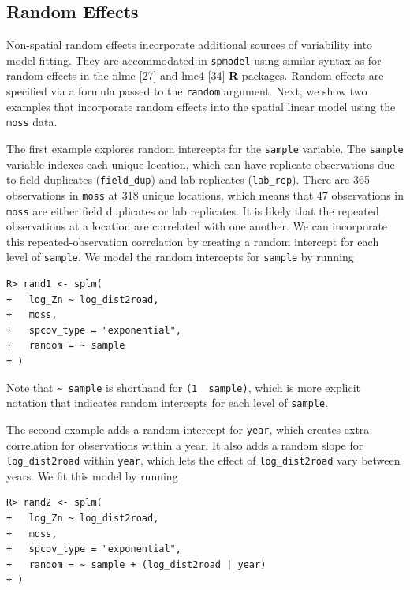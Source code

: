 \documentclass[10pt,letterpaper]{article}
\begin{document}
\hypertarget{random-effects}{%
\subsection{Random Effects}\label{random-effects}}

Non-spatial random effects incorporate additional sources of variability
into model fitting. They are accommodated in \texttt{spmodel} using
similar syntax as for random effects in the nlme {[}27{]} and lme4
{[}34{]} \textbf{\textsf{R}} packages. Random effects are specified via
a formula passed to the \texttt{random} argument. Next, we show two
examples that incorporate random effects into the spatial linear model
using the \texttt{moss} data.

The first example explores random intercepts for the \texttt{sample}
variable. The \texttt{sample} variable indexes each unique location,
which can have replicate observations due to field duplicates
(\texttt{field\_dup}) and lab replicates (\texttt{lab\_rep}). There are
365 observations in \texttt{moss} at 318 unique locations, which means
that 47 observations in \texttt{moss} are either field duplicates or lab
replicates. It is likely that the repeated observations at a location
are correlated with one another. We can incorporate this
repeated-observation correlation by creating a random intercept for each
level of \texttt{sample}. We model the random intercepts for
\texttt{sample} by running

\begin{verbatim}
R> rand1 <- splm(
+   log_Zn ~ log_dist2road,
+   moss,
+   spcov_type = "exponential",
+   random = ~ sample
+ )
\end{verbatim}

Note that \texttt{\textasciitilde{}\ sample} is shorthand for
\texttt{(1\ \textbar{}\ sample)}, which is more explicit notation that
indicates random intercepts for each level of \texttt{sample}.

The second example adds a random intercept for \texttt{year}, which
creates extra correlation for observations within a year. It also adds a
random slope for \texttt{log\_dist2road} within \texttt{year}, which
lets the effect of \texttt{log\_dist2road} vary between years. We fit
this model by running

\begin{verbatim}
R> rand2 <- splm(
+   log_Zn ~ log_dist2road,
+   moss,
+   spcov_type = "exponential",
+   random = ~ sample + (log_dist2road | year)
+ )
\end{verbatim}
\end{document}

